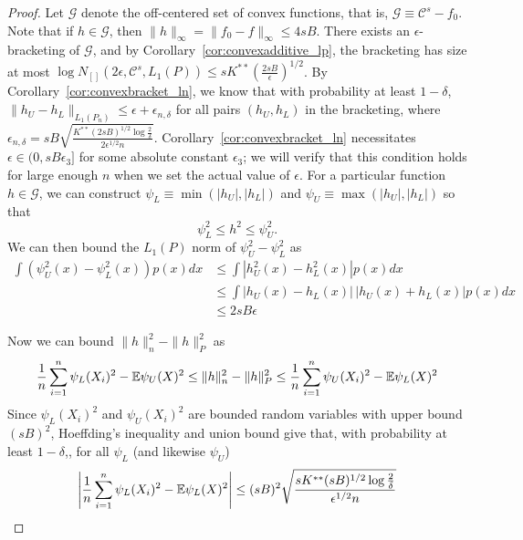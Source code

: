 \begin{proof}
Let $\mathcal{G}$ denote the off-centered set of convex functions, that is, $\mathcal{G} \equiv \mathcal{C}^s - f_0$. Note that if $h \in \mathcal{G}$, then $\| h \|_\infty = \| f_0 - f \|_\infty \leq 4 s B$.
There exists an $\epsilon$-bracketing of $\mathcal{G}$, and
by Corollary~\ref{cor:convexadditive_lp}, the bracketing has size at most $\log N_{[]}(2\epsilon, \mathcal{C}^s, L_1(P)) \leq s K^{**}\left( \frac{2sB}{\epsilon} \right)^{1/2}$. By Corollary~\ref{cor:convexbracket_ln}, we know that with probability at least $1-\delta$, $\|h_U - h_L\|_{L_1(P_n)} \leq \epsilon + \epsilon_{n,\delta}$ for all pairs $(h_U, h_L)$ in the bracketing, where $\epsilon_{n,\delta} = sB \sqrt{ \frac{K^{**} (2sB)^{1/2} \log \frac{2}{\delta}}{2 \epsilon^{1/2} n}}$. Corollary~\ref{cor:convexbracket_ln} necessitates $\epsilon \in (0, sB\epsilon_3]$ for some absolute constant $\epsilon_3$; we will verify that this condition holds for large enough $n$ when we set the actual value of $\epsilon$.
For a particular function $h \in \mathcal{G}$, we can construct $\psi_L \equiv \min( |h_U|, |h_L|)$ and $\psi_U \equiv \max( |h_U|, |h_L| )$ so that
\[
\psi_L^2 \leq h^2 \leq \psi_U^2.
\]
We can then bound the $L_1(P)$ norm of $\psi_U^2 - \psi_L^2$ as
\begin{align*}
\int (\psi_U^2(x) - \psi_L^2(x)) p(x)dx  &\leq  \int | h_U^2(x) - h_L^2(x)| p(x) dx \\
   &\leq \int | h_U(x) - h_L(x) | \, |h_U(x) + h_L(x)| p(x) dx \\
   &\leq 2sB \epsilon
\end{align*}

Now we can bound $\| h \|_n^2 - \| h \|_P^2$ as
\begin{align}
\frac{1}{n} \sum_{i=1}^n \psi_L(X_i)^2 - {\mathbb E} \psi_U(X)^2  \leq
    \| h \|_n^2 - \| h \|_P^2 \leq
  \frac{1}{n} \sum_{i=1}^n \psi_U(X_i)^2 - {\mathbb E} \psi_L(X)^2  \label{eqn:hpsi_bound}
\end{align}
Since 
$\psi_L(X_i)^2$ and $\psi_U(X_i)^2$ are bounded random variables with
upper bound $(sB)^2$, Hoeffding's inequality and union bound give that,
with probability at least $1-\delta$,, for all $\psi_L$ (and likewise $\psi_U$)
\[
\left| \frac{1}{n} \sum_{i=1}^n \psi_L(X_i)^2 - 
   {\mathbb E} \psi_L(X)^2 \right| \leq (sB)^2 \sqrt{ \frac{ sK^{**} (sB)^{1/2} \log \frac{2}{\delta}}{ \epsilon^{1/2} n} }
\]


\end{proof}
